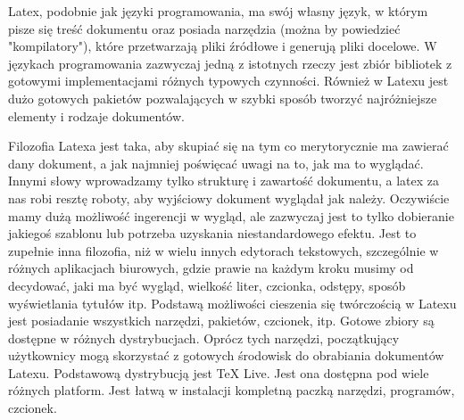 Latex, podobnie jak języki programowania, ma swój własny język, w którym pisze się treść dokumentu oraz posiada narzędzia (można by powiedzieć "kompilatory"), które przetwarzają pliki źródłowe i generują pliki docelowe. W językach programowania zazwyczaj jedną z istotnych rzeczy jest zbiór bibliotek z gotowymi implementacjami różnych typowych czynności. Również w Latexu jest dużo gotowych pakietów pozwalających w szybki sposób tworzyć najróżniejsze elementy i rodzaje dokumentów.\newline

Filozofia Latexa jest taka, aby skupiać się na tym co merytorycznie ma zawierać dany dokument, a jak najmniej poświęcać uwagi na to, jak ma to wyglądać. Innymi słowy wprowadzamy tylko strukturę i zawartość dokumentu, a latex za nas robi resztę roboty, aby wyjściowy dokument wyglądał jak należy. Oczywiście mamy dużą możliwość ingerencji w wygląd, ale zazwyczaj jest to tylko dobieranie jakiegoś szablonu lub potrzeba uzyskania niestandardowego efektu. Jest to zupełnie inna filozofia, niż w wielu innych edytorach tekstowych, szczególnie w różnych aplikacjach biurowych, gdzie prawie na każdym kroku musimy od decydować, jaki ma być wygląd, wielkość liter, czcionka, odstępy, sposób wyświetlania tytułów itp.\newline 
Podstawą możliwości cieszenia się twórczością w Latexu jest posiadanie wszystkich narzędzi, pakietów, czcionek, itp. Gotowe zbiory są dostępne w różnych dystrybucjach. Oprócz tych narzędzi, początkujący użytkownicy mogą skorzystać z gotowych środowisk do obrabiania dokumentów Latexu.\newline
Podstawową dystrybucją jest TeX Live. Jest ona dostępna pod wiele różnych platform. Jest łatwą w instalacji kompletną paczką narzędzi, programów, czcionek.


